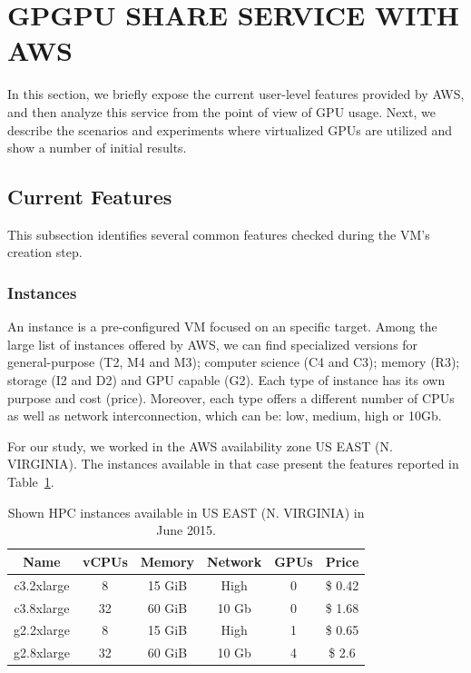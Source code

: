 \documentclass[a4paper,twoside]{article}
\begin{document}
\section{\uppercase{GPGPU share service with AWS}}
\label{sec:workingaws}
In this section, we briefly expose the current user-level features 
provided by AWS, and then analyze this service  
from the point of view of GPU usage. 
Next, we describe the scenarios and experiments where virtualized GPUs are utilized and show a number of initial results.

\subsection{Current Features}
This subsection identifies several common features checked during 
the VM's creation step.

\subsubsection{Instances}

An instance is a pre-configured VM focused on an 
specific target. Among the large list of instances offered by AWS, 
we can find specialized versions for general-purpose (T2, M4 and M3); computer science (C4 and C3); memory (R3); storage (I2 and D2) and 
GPU capable (G2). Each type of instance has its own purpose and cost (price). 
Moreover, each type offers a different number of CPUs as well as network 
interconnection, which can be: low, medium, high or 10Gb.

For our study, we worked in the AWS availability zone US EAST (N. VIRGINIA). 
The instances available in that case present the features reported in Table~\ref{table:awsInstances}. 

\begin{table}[htb]
\renewcommand{\arraystretch}{1.3}
\caption{Shown HPC instances available in US EAST (N. VIRGINIA) in June 2015.}
\label{table:awsInstances}
\tabcolsep=0.09cm
\begin{center}\begin{tabular}{cccccc}
Name & vCPUs & Memory & Network & GPUs & Price\\ \hline \hline
c3.2xlarge & 8 & 15 GiB & High & 0 & \$ 0.42\\ \hline
c3.8xlarge & 32 & 60 GiB & 10 Gb & 0 & \$ 1.68 \\ \hline
g2.2xlarge & 8 & 15 GiB & High & 1 & \$ 0.65\\ \hline
g2.8xlarge & 32 & 60 GiB & 10 Gb & 4 & \$ 2.6 \\ \hline
\end{tabular}\end{center}\end{table}
\end{document}
